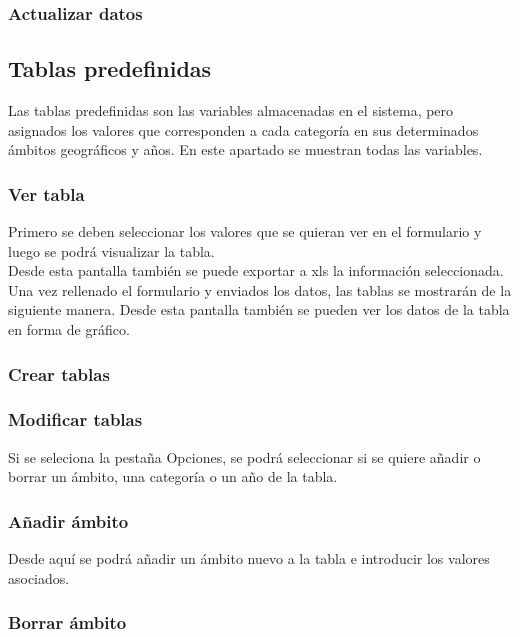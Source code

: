 \subsubsection{Actualizar datos}
\subsection{Tablas predefinidas}
Las tablas predefinidas son las variables almacenadas en el sistema, pero asignados los valores que corresponden a cada categoría en sus determinados ámbitos geográficos y años. En este apartado se muestran todas las variables.
\subsubsection{Ver tabla} 
Primero se deben seleccionar los valores que se quieran ver en el formulario y luego se podrá visualizar la tabla.\\
Desde esta pantalla también se puede exportar a xls la información seleccionada.
Una vez rellenado el formulario y enviados los datos, las tablas se mostrarán de la siguiente manera.
Desde esta pantalla también se pueden ver los datos de la tabla en forma de gráfico.
\subsubsection{Crear tablas}
\subsubsection{Modificar tablas}
Si se seleciona la pestaña Opciones, se podrá seleccionar si se quiere añadir o borrar un ámbito, una categoría o un año de la tabla.
\subsubsection{Añadir ámbito}
Desde aquí se podrá añadir un ámbito nuevo a la tabla e introducir los valores asociados.
\subsubsection{Borrar ámbito}

